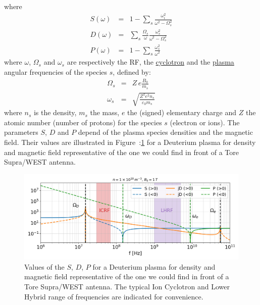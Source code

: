 where
\begin{subequations}
	\begin{eqnarray}
	S(\omega) 
	& = & 
	1-\sum_{s}\frac{\omega_{i}^{2}}{\omega^{2}-\Omega_{s}^{2}}
	\label{eq:stix_S}
	\\
	D(\omega) 
	& = & 
	\sum_{s}\frac{\Omega_{s}}{\omega}\frac{\omega_{s}^{2}}{\omega^{2}-\Omega_{s}^{2}}
	\label{eq:stix_D}
	\\
	P(\omega) 
	& = & 
	1-\sum_{s}\frac{\omega_{s}^{2}}{\omega^{2}}
	\label{eq:stix_P}
	\end{eqnarray}
	\label{eq:stix_SDP}
\end{subequations}
where $\omega$, $\Omega_{s}$ and $\omega_{s}$ are respectively the RF, the \href{http://docs.plasmapy.org/en/v0.1/api/plasmapy.physics.parameters.gyrofrequency.html}{cyclotron} and the \href{http://docs.plasmapy.org/en/v0.1/api/plasmapy.physics.parameters.plasma_frequency.html#plasmapy.physics.parameters.plasma_frequency}{plasma} angular frequencies of the species $s$, defined by:
\begin{subequations}
	\begin{eqnarray}
	\Omega_{s}  &=& Z\, e \frac{B_{0}}{m_{s}}
	\label{eq:cyclotron_angular_frequency} 
	\\
	\omega_{s}  &=& \sqrt{ \frac{Z^2 e^2 n_{s}}{\varepsilon_{0} m_{s}}}
	\end{eqnarray}
\end{subequations}
where $n_s$ is the density, $m_s$ the mass, $e$ the (signed) elementary charge and $Z$ the atomic number (number of protons) for the species $s$ (electron or ions). The parameters $S$, $D$ and $P$ depend of the plasma species densities and the magnetic field. Their values are illustrated in Figure~:\ref{fig:sdpvsfnfixedbfixed} for a Deuterium plasma for density and magnetic field representative of the one we could find in front of a Tore Supra/WEST antenna.

\begin{figure}[h]
	\centering
	\includegraphics[width=1.0\linewidth]{figures/chap2/SDP_vs_f_nfixed_Bfixed}
	\caption{Values of the $S$, $D$, $P$ for a Deuterium plasma for density and magnetic field representative of the one we could find in front of a Tore Supra/WEST antenna. The typical Ion Cyclotron and Lower Hybrid range  of frequencies are indicated for convenience.}
	\label{fig:sdpvsfnfixedbfixed}
\end{figure}

